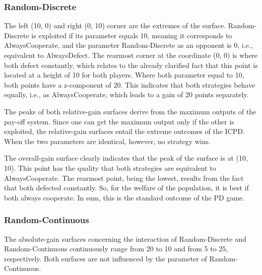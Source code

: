 \documentclass[11pt]{article}
\begin{document}
\subsubsection*{Random-Discrete}
		The left (10, 0) and right (0, 10) corner are the extremes of the surface.
		Random-Discrete is exploited if its parameter equals 10, meaning it corresponds to AlwaysCooperate, and the parameter Random-Discrete as an opponent is 0, i.e., equivalent to AlwaysDefect.
		The rearmost corner at the coordinate (0, 0) is where both defect constantly, which relates to the already clarified fact that this point is located at a height of 10 for both players.
		Where both parameter equal to 10, both points have a z-component of 20.
		This indicates that both strategies behave equally, i.e., as AlwaysCooperate, which leads to a gain of 20 points separately.

		The peaks of both relative-gain surfaces derive from the maximum outputs of the pay-off system.
		Since one can get the maximum output only if the other is exploited, the relative-gain surfaces entail the extreme outcomes of the ICPD.
		When the two parameters are identical, however, no strategy wins.

		The overall-gain surface clearly indicates that the peak of the surface is at (10, 10).
		This point has the quality that both strategies are equivalent to AlwaysCooperate.
		The rearmost point, being the lowest, results from the fact that both defected constantly.
		So, for the welfare of the population, it is best if both always cooperate.
		In sum, this is the standard outcome of the PD game.

\subsubsection*{Random-Continuous}
		The absolute-gain surfaces concerning the interaction of Random-Discrete and Random-Continuous continuously range from 20 to 10 and from 5 to 25, respectively.
		Both surfaces are not influenced by the parameter of Random-Continuous.

\end{document}
